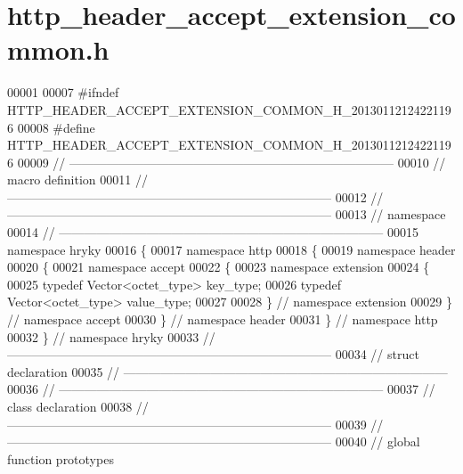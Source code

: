 \hypertarget{http__header__accept__extension__common_8h_source}{\section{http\-\_\-header\-\_\-accept\-\_\-extension\-\_\-common.\-h}
}

\begin{DoxyCode}
00001 
00007 \textcolor{preprocessor}{#ifndef HTTP\_HEADER\_ACCEPT\_EXTENSION\_COMMON\_H\_20130112124221196}
00008 \textcolor{preprocessor}{}\textcolor{preprocessor}{#define HTTP\_HEADER\_ACCEPT\_EXTENSION\_COMMON\_H\_20130112124221196}
00009 \textcolor{preprocessor}{}\textcolor{comment}{//
      ------------------------------------------------------------------------------}
00010 \textcolor{comment}{// macro definition}
00011 \textcolor{comment}{//
      ------------------------------------------------------------------------------}
00012 \textcolor{comment}{//
      ------------------------------------------------------------------------------}
00013 \textcolor{comment}{// namespace}
00014 \textcolor{comment}{//
      ------------------------------------------------------------------------------}
00015 \textcolor{keyword}{namespace }hryky
00016 \{
00017 \textcolor{keyword}{namespace }http
00018 \{
00019 \textcolor{keyword}{namespace }header
00020 \{
00021 \textcolor{keyword}{namespace }accept
00022 \{
00023 \textcolor{keyword}{namespace }extension
00024 \{
00025     \textcolor{keyword}{typedef} Vector<octet\_type> key\_type;
00026     \textcolor{keyword}{typedef} Vector<octet\_type> value\_type;
00027     
00028 \} \textcolor{comment}{// namespace extension}
00029 \} \textcolor{comment}{// namespace accept}
00030 \} \textcolor{comment}{// namespace header}
00031 \} \textcolor{comment}{// namespace http}
00032 \} \textcolor{comment}{// namespace hryky}
00033 \textcolor{comment}{//
      ------------------------------------------------------------------------------}
00034 \textcolor{comment}{// struct declaration}
00035 \textcolor{comment}{//
      ------------------------------------------------------------------------------}
00036 \textcolor{comment}{//
      ------------------------------------------------------------------------------}
00037 \textcolor{comment}{// class declaration}
00038 \textcolor{comment}{//
      ------------------------------------------------------------------------------}
00039 \textcolor{comment}{//
      ------------------------------------------------------------------------------}
00040 \textcolor{comment}{// global function prototypes}

\end{DoxyCode}
